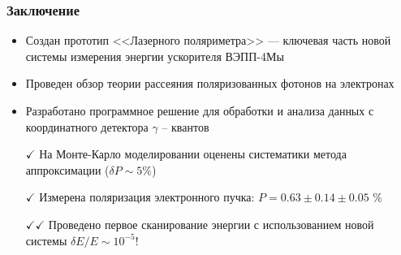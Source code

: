 \documentclass[12pt,aspectratio=169]{beamer}
\newcommand{\backupbegin}{
	\newcounter{finalframe}
	\setcounter{finalframe}{\value{framenumber}}
}
\begin{document}
\begin{frame}[t]
	\frametitle{Заключение}
	\begin{itemize}
		\item  Создан прототип <<Лазерного поляриметра>> --- ключевая часть новой системы измерения энергии ускорителя ВЭПП-4Мы
		\item Проведен обзор теории рассеяния поляризованных фотонов на электронах
		\item Разработано программное решение для обработки и анализа данных с координатного детектора $\gamma$ -- квантов
		\item[\textcolor{calmGreen}{$\checkmark$}] На Монте-Карло моделировании оценены систематики метода аппроксимации ($\delta P \sim 5\%$)
		\item[\textcolor{calmGreen}{$\checkmark$}] Измерена поляризация электронного пучка: $P = 0.63 \pm 0.14\pm 0.05$ \% 
		\item[\textcolor{calmGreen}{$\checkmark \checkmark$}] Проведено первое сканирование энергии с использованием новой системы $\delta E/E \sim 10^{-5}$!
	\end{itemize}
\end{frame}

\maketitle


\backupbegin
%
\end{document}
